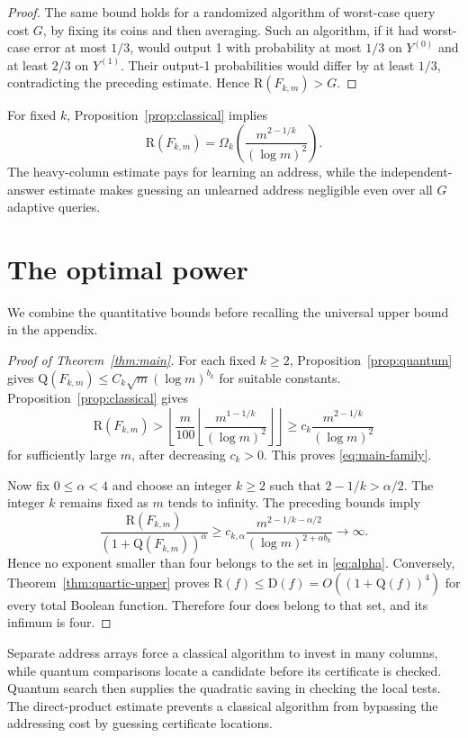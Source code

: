\documentclass[11pt]{article}
\theoremstyle{definition}
\newcommand{\R}{\mathrm R}
\newcommand{\Q}{\mathrm Q}
\newcommand{\D}{\mathrm D}
\begin{document}
\begin{proof}
The same bound holds for a randomized algorithm of worst-case query
cost $G$, by fixing its coins and then averaging.  Such an algorithm,
if it had worst-case error at most $1/3$, would output 1 with probability
at most $1/3$ on $Y^{(0)}$ and at least $2/3$ on $Y^{(1)}$.  Their
output-1 probabilities would differ by at least $1/3$, contradicting
the preceding estimate.  Hence $\R(F_{k,m})>G$.
\end{proof}

For fixed $k$, Proposition~\ref{prop:classical} implies
\[
 \R(F_{k,m})=
 \Omega_k\!\left(\frac{m^{2-1/k}}{(\log m)^2}\right).
\]
The heavy-column estimate pays for learning an address, while the
independent-answer estimate makes guessing an unlearned address
negligible even over all $G$ adaptive queries.

\section{The optimal power}\label{sec:exponent}

We combine the quantitative bounds before recalling the universal upper
bound in the appendix.

\begin{proof}[Proof of Theorem~\ref{thm:main}]
For each fixed $k\ge2$, Proposition~\ref{prop:quantum} gives
$\Q(F_{k,m})\le C_k\sqrt m(\log m)^{b_k}$ for suitable constants.
Proposition~\ref{prop:classical} gives
\[
 \R(F_{k,m})>
 \left\lfloor\frac m{100}
  \left\lfloor\frac{m^{1-1/k}}{(\log m)^2}\right\rfloor
 \right\rfloor
 \ge c_k\frac{m^{2-1/k}}{(\log m)^2}
\]
for sufficiently large $m$, after decreasing $c_k>0$.
This proves \eqref{eq:main-family}.

Now fix $0\le\alpha<4$ and choose an integer $k\ge2$ such that
$2-1/k>\alpha/2$. The integer $k$ remains fixed as $m$ tends to infinity.
The preceding bounds imply
\[
 \frac{\R(F_{k,m})}{(1+\Q(F_{k,m}))^\alpha}
 \ge c_{k,\alpha}
 \frac{m^{2-1/k-\alpha/2}}
 {(\log m)^{2+\alpha b_k}}
 \longrightarrow\infty.
\]
Hence no exponent smaller than four belongs to the set in
\eqref{eq:alpha}. Conversely, Theorem~\ref{thm:quartic-upper} proves
$\R(f)\le\D(f)=O((1+\Q(f))^4)$ for every total Boolean function.
Therefore four does belong to that set, and its infimum is four.
\end{proof}

Separate address arrays force a classical algorithm to invest in many
columns, while quantum comparisons locate a candidate before its
certificate is checked. Quantum search then supplies the quadratic
saving in checking the local tests. The direct-product estimate prevents
a classical algorithm from bypassing the addressing cost by guessing
certificate locations.
\end{document}
